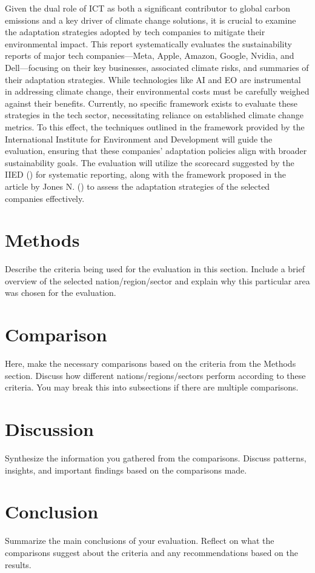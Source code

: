 \documentclass[12pt]{article}
\begin{document}
Given the dual role of ICT as both a significant contributor to global carbon emissions and a key driver of climate change solutions, it is crucial to examine the adaptation strategies adopted by tech companies to mitigate their environmental impact. This report systematically evaluates the sustainability reports of major tech companies—Meta, Apple, Amazon, Google, Nvidia, and Dell—focusing on their key businesses, associated climate risks, and summaries of their adaptation strategies. While technologies like  AI and EO are instrumental in addressing climate change, their environmental costs must be carefully weighed against their benefits. Currently, no specific framework exists to evaluate these strategies in the tech sector, necessitating reliance on established climate change metrics. To this effect, the techniques outlined in the framework provided by the International Institute for Environment and Development will guide the evaluation, ensuring that these companies’ adaptation policies align with broader sustainability goals. The evaluation will utilize the scorecard suggested by the IIED (\cite{craft_2016}) for systematic reporting, along with the framework proposed in the article by Jones N. (\cite{jones_2001}) to assess the adaptation strategies of the selected companies effectively.


\section*{Methods}
Describe the criteria being used for the evaluation in this section. Include a brief overview of the selected nation/region/sector and explain why this particular area was chosen for the evaluation.

\section*{Comparison}
Here, make the necessary comparisons based on the criteria from the Methods section. Discuss how different nations/regions/sectors perform according to these criteria. You may break this into subsections if there are multiple comparisons.

\section*{Discussion}
Synthesize the information you gathered from the comparisons. Discuss patterns, insights, and important findings based on the comparisons made.

\section*{Conclusion}
Summarize the main conclusions of your evaluation. Reflect on what the comparisons suggest about the criteria and any recommendations based on the results.

\newpage
\printbibliography
\end{document}
